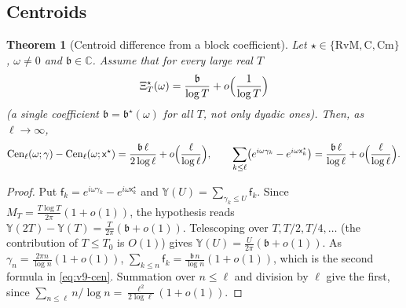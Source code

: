 \documentclass[11pt,a4paper]{article}
\numberwithin{equation}{section}
\newtheorem{theorem}{Theorem}[section]
\theoremstyle{definition}
\theoremstyle{remark}
\newcommand{\Cm}{\mathrm{Cm}}
\begin{document}
\subsection{Centroids}\label{sec:v9-cen}
\begin{theorem}[Centroid difference from a block coefficient]\label{thm:v9-cen}
Let $\star\in\{\mathrm{RvM},\mathrm C,\Cm\}$, $\omega\ne0$ and $\mathfrak b\in\mathbb C$. Assume that for \emph{every} large real $T$
\begin{equation}
\Xi_T^\star(\omega)=\frac{\mathfrak b}{\log T}+o\Bigl(\frac1{\log T}\Bigr)
\end{equation}
(a single coefficient $\mathfrak b=\mathfrak b^\star(\omega)$ for all $T$, not only dyadic ones). Then, as $\ell\to\infty$,
\begin{equation}\label{eq:v9-cen}
\mathrm{Cen}_\ell(\omega;\gamma)-\mathrm{Cen}_\ell(\omega;\mathsf x^\star)=\frac{\mathfrak b\,\ell}{2\log\ell}+o\Bigl(\frac\ell{\log\ell}\Bigr),
\qquad
\sum_{k\le\ell}\bigl(e^{i\omega\gamma_k}-e^{i\omega\mathsf x_k^\star}\bigr)=\frac{\mathfrak b\,\ell}{\log\ell}+o\Bigl(\frac\ell{\log\ell}\Bigr).
\end{equation}
\end{theorem}
\begin{proof}
Put $\mathsf f_k=e^{i\omega\gamma_k}-e^{i\omega\mathsf x_k^\star}$ and $\mathbb Y(U)=\sum_{\gamma_k\le U}\mathsf f_k$. Since $M_T=\frac{T\log T}{2\pi}(1+o(1))$, the hypothesis reads $\mathbb Y(2T)-\mathbb Y(T)=\frac{T}{2\pi}(\mathfrak b+o(1))$. Telescoping over $T,T/2,T/4,\dots$ (the contribution of $T\le T_0$ is $O(1)$) gives $\mathbb Y(U)=\frac U{2\pi}(\mathfrak b+o(1))$. As $\gamma_n=\frac{2\pi n}{\log n}(1+o(1))$, $\sum_{k\le n}\mathsf f_k=\frac{\mathfrak b\,n}{\log n}(1+o(1))$, which is the second formula in \eqref{eq:v9-cen}. Summation over $n\le\ell$ and division by $\ell$ give the first, since $\sum_{n\le\ell}n/\log n=\frac{\ell^2}{2\log\ell}(1+o(1))$.
\end{proof}
\end{document}
